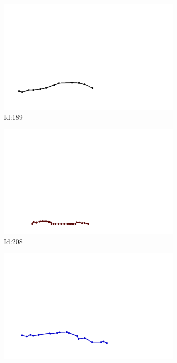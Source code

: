 \documentclass[12pt,twoside]{report}
\begin{document}
\begin{figure}
\centering
\begin{subfigure}[b]{0.20\textwidth}
\centering
\includegraphics[width=\textwidth]{../../trajectories/189.png}
\caption{Id:189}
\end{subfigure}
\begin{subfigure}[b]{0.20\textwidth}
\centering
\includegraphics[width=\textwidth]{../../trajectories/208.png}
\caption{Id:208}
\end{subfigure}
\begin{subfigure}[b]{0.20\textwidth}
\centering
\includegraphics[width=\textwidth]{../../trajectories/256.png}

\end{subfigure}
\end{figure}
\end{document}
